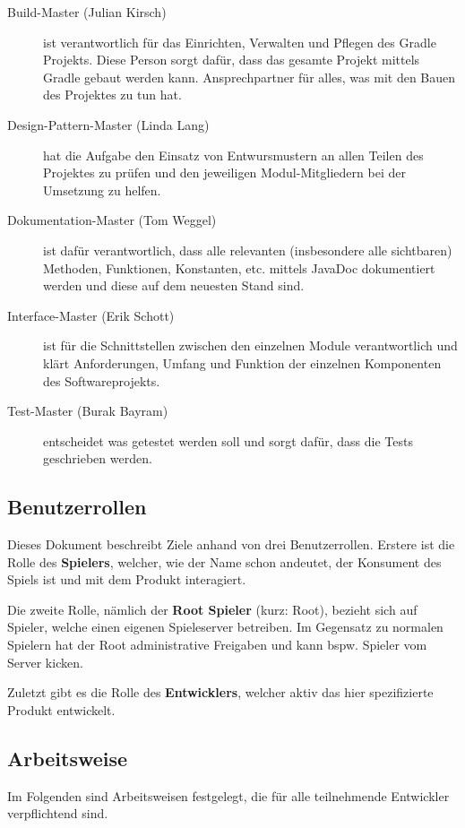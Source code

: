 \documentclass[a4paper]{scrreprt}
\begin{document}
\begin{description}
	\item[Build-Master (Julian Kirsch)] ist verantwortlich für das Einrichten, Verwalten und Pflegen des Gradle Projekts. 
						 Diese Person sorgt dafür, dass das gesamte Projekt mittels Gradle gebaut werden kann.
						 Ansprechpartner für alles, was mit den Bauen des Projektes zu tun hat.
	\item[Design-Pattern-Master (Linda Lang)] hat die Aufgabe den Einsatz von Entwursmustern an allen Teilen des Projektes zu prüfen und den jeweiligen Modul-Mitgliedern bei der
							    Umsetzung zu helfen.
	\item[Dokumentation-Master (Tom Weggel)] ist dafür verantwortlich, dass alle relevanten (insbesondere alle sichtbaren) Methoden, Funktionen, Konstanten, etc. mittels JavaDoc
							       dokumentiert  werden und diese auf dem neuesten Stand sind.
	\item[Interface-Master (Erik Schott)] ist für die Schnittstellen zwischen den einzelnen Module verantwortlich und klärt Anforderungen, Umfang und Funktion der einzelnen Komponenten 
						      des Softwareprojekts.
	\item[Test-Master (Burak Bayram)] entscheidet was getestet werden soll und sorgt dafür, dass die Tests geschrieben werden.
\end{description}

\subsection{Benutzerrollen}

Dieses Dokument beschreibt Ziele anhand von drei Benutzerrollen. Erstere ist die Rolle des \textbf{Spielers}, welcher, wie der Name schon andeutet, der Konsument des Spiels ist und mit dem
Produkt interagiert.

Die zweite Rolle, nämlich der \textbf{Root Spieler} (kurz: Root), bezieht sich auf Spieler, welche einen eigenen Spieleserver betreiben. Im Gegensatz zu normalen Spielern hat der Root administrative Freigaben und kann bspw. Spieler vom Server \glqq kicken\grqq{}.

Zuletzt gibt es die Rolle des \textbf{Entwicklers}, welcher aktiv das hier spezifizierte Produkt entwickelt.

\subsection{Arbeitsweise}
Im Folgenden sind Arbeitsweisen festgelegt, die für alle teilnehmende Entwickler verpflichtend sind.
\end{document}
